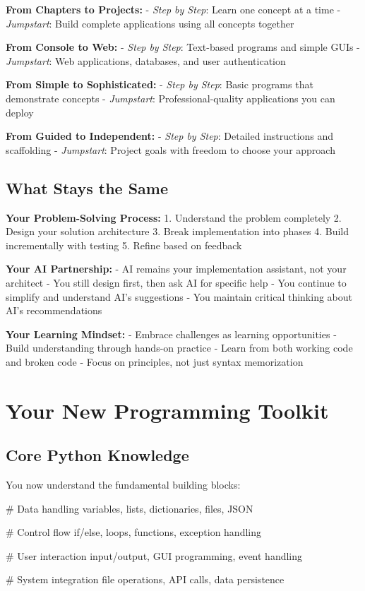 \documentclass[
  letterpaper,
  DIV=11,
  numbers=noendperiod,
  oneside]{scrreprt}
\newenvironment{Shaded}{}{}
\newcommand{\BuiltInTok}[1]{\textcolor[rgb]{0.84,0.23,0.29}{#1}}
\newcommand{\CommentTok}[1]{\textcolor[rgb]{0.42,0.45,0.49}{#1}}
\newcommand{\ControlFlowTok}[1]{\textcolor[rgb]{0.84,0.23,0.29}{#1}}
\newcommand{\NormalTok}[1]{\textcolor[rgb]{0.14,0.16,0.18}{#1}}
\newcommand{\OperatorTok}[1]{\textcolor[rgb]{0.14,0.16,0.18}{#1}}
\begin{document}
\textbf{From Chapters to Projects:} - \emph{Step by Step}: Learn one
concept at a time - \emph{Jumpstart}: Build complete applications using
all concepts together

\textbf{From Console to Web:} - \emph{Step by Step}: Text-based programs
and simple GUIs - \emph{Jumpstart}: Web applications, databases, and
user authentication

\textbf{From Simple to Sophisticated:} - \emph{Step by Step}: Basic
programs that demonstrate concepts - \emph{Jumpstart}:
Professional-quality applications you can deploy

\textbf{From Guided to Independent:} - \emph{Step by Step}: Detailed
instructions and scaffolding - \emph{Jumpstart}: Project goals with
freedom to choose your approach

\subsection{What Stays the Same}\label{what-stays-the-same}

\textbf{Your Problem-Solving Process:} 1. Understand the problem
completely 2. Design your solution architecture 3. Break implementation
into phases 4. Build incrementally with testing 5. Refine based on
feedback

\textbf{Your AI Partnership:} - AI remains your implementation
assistant, not your architect - You still design first, then ask AI for
specific help - You continue to simplify and understand AI's suggestions
- You maintain critical thinking about AI's recommendations

\textbf{Your Learning Mindset:} - Embrace challenges as learning
opportunities - Build understanding through hands-on practice - Learn
from both working code and broken code - Focus on principles, not just
syntax memorization

\section{Your New Programming
Toolkit}\label{your-new-programming-toolkit}

\subsection{Core Python Knowledge}\label{core-python-knowledge}

You now understand the fundamental building blocks:

\begin{Shaded}
\begin{Highlighting}[]
\CommentTok{\# Data handling}
\NormalTok{variables, lists, dictionaries, files, JSON}

\CommentTok{\# Control flow  }
\ControlFlowTok{if}\OperatorTok{/}\ControlFlowTok{else}\NormalTok{, loops, functions, exception handling}

\CommentTok{\# User interaction}
\BuiltInTok{input}\OperatorTok{/}\NormalTok{output, GUI programming, event handling}

\CommentTok{\# System integration}
\BuiltInTok{file}\NormalTok{ operations, API calls, data persistence}
\end{Highlighting}
\end{Shaded}
\end{document}
